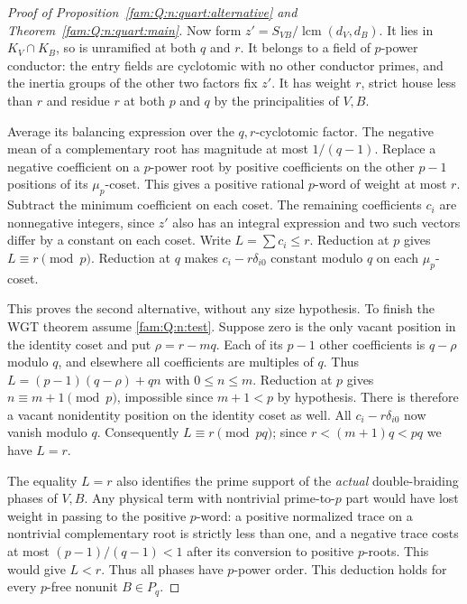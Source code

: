 \documentclass[11pt,a4paper]{article}
\numberwithin{equation}{section}
\theoremstyle{remark}
\newcommand{\lcm}{\operatorname{lcm}}
\begin{document}
\begin{proof}[Proof of Proposition~\ref{fam:Q:n:quart:alternative} and Theorem~\ref{fam:Q:n:quart:main}]
Now form $z'=S_{VB}/\lcm(d_V,d_B)$. It lies in $K_V\cap K_B$,
so is unramified at both $q$ and $r$. It belongs to a field of
$p$-power conductor: the entry fields are cyclotomic with no other
conductor primes, and the inertia groups of the other two factors
fix $z'$. It has weight $r$, strict house less than $r$ and
residue $r$ at both $p$ and $q$ by the principalities of $V,B$.

Average its balancing expression over the $q,r$-cyclotomic factor.
The negative mean of a complementary root has magnitude at most
$1/(q-1)$. Replace a negative coefficient on a $p$-power root by
positive coefficients on the other $p-1$ positions of its $\mu_p$-coset.
This gives a positive rational $p$-word of weight at most $r$.
Subtract the minimum coefficient on each coset. The remaining
coefficients $c_i$ are nonnegative integers, since $z'$ also has
an integral expression and two such vectors differ by a constant
on each coset. Write $L=\sum c_i\le r$. Reduction at $p$ gives
$L\equiv r\pmod p$. Reduction at $q$ makes
$c_i-r\delta_{i0}$ constant modulo $q$ on each $\mu_p$-coset.

This proves the second alternative, without any size hypothesis.
To finish the WGT theorem assume \eqref{fam:Q:n:test}. Suppose zero is
the only vacant position in the identity coset
and put $\rho=r-mq$. Each of its $p-1$ other coefficients is
$q-\rho$ modulo $q$, and elsewhere all coefficients are multiples
of $q$. Thus $L=(p-1)(q-\rho)+qn$ with $0\le n\le m$. Reduction
at $p$ gives $n\equiv m+1\pmod p$, impossible since $m+1<p$ by hypothesis. There is therefore a vacant nonidentity position
on the identity coset as well. All $c_i-r\delta_{i0}$ now vanish
modulo $q$. Consequently $L\equiv r\pmod{pq}$; since
$r<(m+1)q<pq$ we have $L=r$. 

The equality $L=r$ also identifies the prime support of the
\emph{actual} double-braiding phases of $V,B$. Any physical term
with nontrivial prime-to-$p$ part would have lost weight in passing
to the positive $p$-word: a positive normalized trace on a
nontrivial complementary root is strictly less than one, and a
negative trace costs at most $(p-1)/(q-1)<1$ after its conversion
to positive $p$-roots. This would give $L<r$. Thus all phases
have $p$-power order. This deduction holds for every $p$-free
nonunit $B\in P_q$.


\end{proof}
\end{document}
